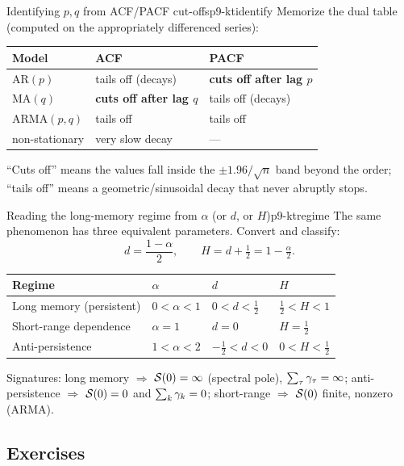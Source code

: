 \begin{keytech}{Identifying $p,q$ from ACF/PACF cut-offs}{p9-ktidentify}
Memorize the dual table (computed on the appropriately differenced series):
\begin{center}
\begin{tabular}{lll}
\toprule
Model & ACF & PACF \\
\midrule
AR$(p)$  & tails off (decays) & \textbf{cuts off after lag $p$} \\
MA$(q)$  & \textbf{cuts off after lag $q$} & tails off (decays) \\
ARMA$(p,q)$ & tails off & tails off \\
non-stationary & very slow decay & --- \\
\bottomrule
\end{tabular}
\end{center}
``Cuts off'' means the values fall inside the $\pm1.96/\sqrt n$ band beyond the
order; ``tails off'' means a geometric/sinusoidal decay that never abruptly
stops.
\end{keytech}

\begin{keytech}{Reading the long-memory regime from $\alpha$ (or $d$, or $H$)}{p9-ktregime}
The same phenomenon has three equivalent parameters. Convert and classify:
\[
d=\frac{1-\alpha}{2},\qquad H = d+\tfrac12 = 1-\tfrac{\alpha}{2}.
\]
\begin{center}
\begin{tabular}{llll}
\toprule
Regime & $\alpha$ & $d$ & $H$ \\
\midrule
Long memory (persistent)  & $0<\alpha<1$ & $0<d<\tfrac12$  & $\tfrac12<H<1$ \\
Short-range dependence    & $\alpha=1$   & $d=0$           & $H=\tfrac12$ \\
Anti-persistence          & $1<\alpha<2$ & $-\tfrac12<d<0$ & $0<H<\tfrac12$ \\
\bottomrule
\end{tabular}
\end{center}
Signatures: long memory $\Rightarrow$ $\mathcal{S}(0)=\infty$ (spectral pole),
$\sum_\tau\gamma_\tau=\infty$; anti-persistence $\Rightarrow$ $\mathcal{S}(0)=0$ and
$\sum_k\gamma_k=0$; short-range $\Rightarrow$ $\mathcal{S}(0)$ finite, nonzero (ARMA).
\end{keytech}

\subsection{Exercises}

